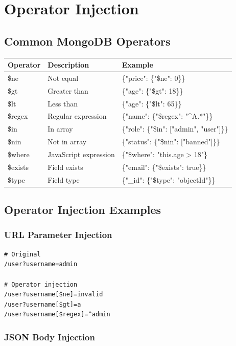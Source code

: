 \documentclass[12pt]{article}
\begin{document}
\section{Operator Injection}

\subsection{Common MongoDB Operators}

\begin{longtable}{|l|l|l|}
\hline
\textbf{Operator} & \textbf{Description} & \textbf{Example} \\
\hline
\$ne & Not equal & \{"price": \{"\$ne": 0\}\} \\
\hline
\$gt & Greater than & \{"age": \{"\$gt": 18\}\} \\
\hline
\$lt & Less than & \{"age": \{"\$lt": 65\}\} \\
\hline
\$regex & Regular expression & \{"name": \{"\$regex": "\^{}A.*"\}\} \\
\hline
\$in & In array & \{"role": \{"\$in": ["admin", "user"]\}\} \\
\hline
\$nin & Not in array & \{"status": \{"\$nin": ["banned"]\}\} \\
\hline
\$where & JavaScript expression & \{"\$where": "this.age > 18"\} \\
\hline
\$exists & Field exists & \{"email": \{"\$exists": true\}\} \\
\hline
\$type & Field type & \{"\_id": \{"\$type": "objectId"\}\} \\
\hline
\end{longtable}

\subsection{Operator Injection Examples}

\subsubsection{URL Parameter Injection}

\begin{lstlisting}
# Original
/user?username=admin

# Operator injection
/user?username[$ne]=invalid
/user?username[$gt]=a
/user?username[$regex]=^admin
\end{lstlisting}

\subsubsection{JSON Body Injection}
\end{document}
